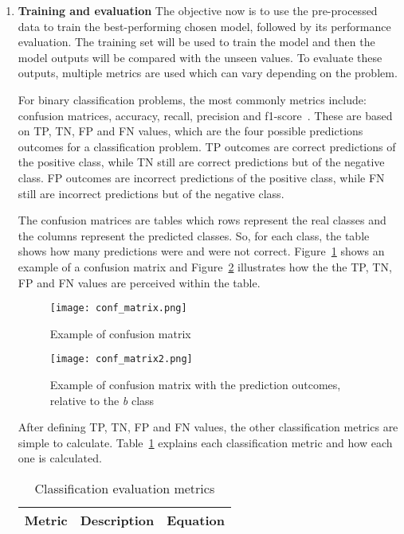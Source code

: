 \begin{enumerate}
    \item \textbf{Training and evaluation} The objective now is to use the pre-processed data to train the best-performing chosen model, followed by its performance evaluation. 
    The training set will be used to train the model and then the model outputs will be compared with the unseen values. To evaluate these outputs, multiple metrics are used which can vary depending on the problem. 
    
    For binary classification problems, the most commonly metrics include: confusion matrices, accuracy, recall, precision and f1-score~\cite{Liu2014AEvaluation}. These are based on \gls{TP}, \gls{TN}, \gls{FP} and \gls{FN} values, which are the four possible predictions outcomes for a classification problem. \gls{TP} outcomes are correct predictions of the positive class, while \gls{TN} still are correct predictions but of the negative class. \gls{FP} outcomes are incorrect predictions of the positive class, while \gls{FN} still are incorrect predictions but of the negative class. 
    
    The confusion matrices are tables which rows represent the real classes and the columns represent the predicted classes. So, for each class, the table shows how many predictions were and were not correct. Figure~\ref{fig:conf_matrix} shows an example of a confusion matrix and Figure~\ref{fig:conf_matrix2} illustrates how the the \gls{TP}, \gls{TN}, \gls{FP} and \gls{FN} values are perceived within the table.
    
    \begin{figure}[htbp]
        \centering
        \texttt{[image: conf\_matrix.png]}
        \caption{Example of confusion matrix}
        \label{fig:conf_matrix}
    \end{figure}
    
    \begin{figure}[htbp]
        \centering
        \texttt{[image: conf\_matrix2.png]}
        \caption{Example of confusion matrix with the prediction outcomes, relative to the \textit{b} class}
        \label{fig:conf_matrix2}
    \end{figure}
    
    After defining \gls{TP}, \gls{TN}, \gls{FP} and \gls{FN} values, the other classification metrics are simple to calculate. Table~\ref{tab:classification_metrics} explains each classification metric and how each one is calculated.
    
    \begin{table}[ht]
    	\caption{Classification evaluation metrics}
        \label{tab:classification_metrics}
    \centering
    \begin{tabular}{p{2.5cm}cc}
    	\toprule
    	\multicolumn{1}{c}{\textbf{Metric}} & \textbf{Description} & \textbf{Equation} \\
    	\midrule
    	

\end{tabular}
\end{table}
\end{enumerate}
